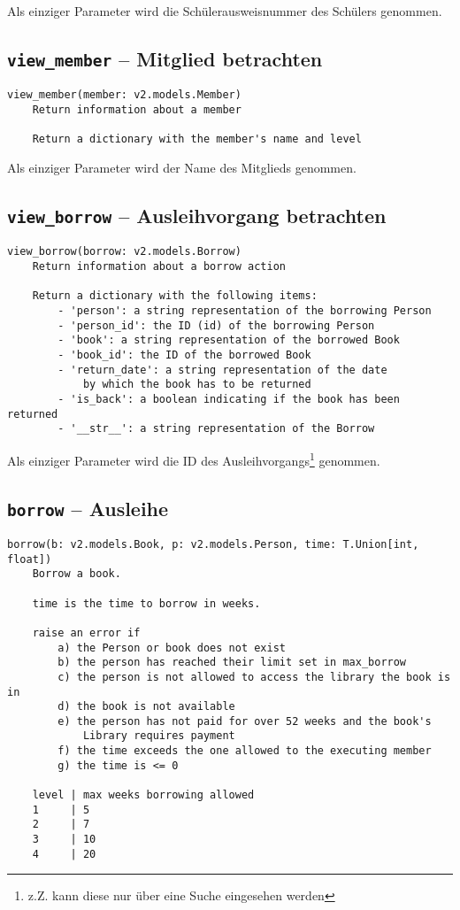 Als einziger Parameter wird die Schülerausweisnummer des Schülers genommen.

\subsection{\texttt{view\_member} -- Mitglied betrachten}
\label{subsec:command_list:view_member}

\begin{verbatim}
view_member(member: v2.models.Member)
    Return information about a member

    Return a dictionary with the member's name and level
\end{verbatim}

Als einziger Parameter wird der Name des Mitglieds genommen.

\subsection{\texttt{view\_borrow} -- Ausleihvorgang betrachten}
\label{subsec:command_list:view_borrow}

\begin{verbatim}
view_borrow(borrow: v2.models.Borrow)
    Return information about a borrow action

    Return a dictionary with the following items:
        - 'person': a string representation of the borrowing Person
        - 'person_id': the ID (id) of the borrowing Person
        - 'book': a string representation of the borrowed Book
        - 'book_id': the ID of the borrowed Book
        - 'return_date': a string representation of the date
            by which the book has to be returned
        - 'is_back': a boolean indicating if the book has been returned
        - '__str__': a string representation of the Borrow
\end{verbatim}

Als einziger Parameter wird die ID des Ausleihvorgangs\footnote{z.Z. kann diese nur über eine Suche eingesehen werden} genommen.

\subsection{\texttt{borrow} -- Ausleihe}
\label{subsec:command_list:borrow}

\begin{verbatim}
borrow(b: v2.models.Book, p: v2.models.Person, time: T.Union[int, float])
    Borrow a book.

    time is the time to borrow in weeks.

    raise an error if
        a) the Person or book does not exist
        b) the person has reached their limit set in max_borrow
        c) the person is not allowed to access the library the book is in
        d) the book is not available
        e) the person has not paid for over 52 weeks and the book's
            Library requires payment
        f) the time exceeds the one allowed to the executing member
        g) the time is <= 0

    level | max weeks borrowing allowed
    1     | 5
    2     | 7
    3     | 10
    4     | 20
\end{verbatim}

